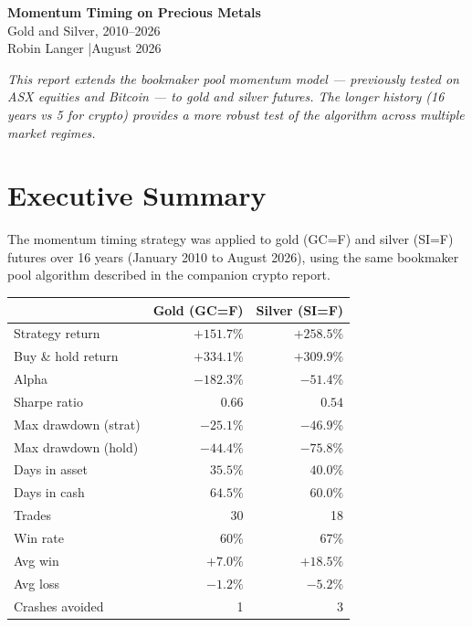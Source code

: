 \documentclass[11pt,a4paper]{article}
\begin{document}
\begin{center}
{\LARGE\bfseries\color{accent} Momentum Timing on Precious Metals}\\[0.5em]
{\large Gold and Silver, 2010--2026}\\[1em]
{\small Robin Langer \quad|\quad August 2026}
\end{center}

\vspace{1em}

\textit{This report extends the bookmaker pool momentum model ---
previously tested on ASX equities and Bitcoin --- to gold and silver
futures. The longer history (16 years vs 5 for crypto) provides a
more robust test of the algorithm across multiple market regimes.}


\section{Executive Summary}

The momentum timing strategy was applied to gold (GC=F) and silver
(SI=F) futures over 16 years (January 2010 to August 2026), using
the same bookmaker pool algorithm described in the companion crypto
report.

\vspace{0.5em}
\begin{tabular}{@{}lrr@{}}
    \toprule
    & \textbf{Gold (GC=F)} & \textbf{Silver (SI=F)} \\
    \midrule
    Strategy return     & $+151.7\%$  & $+258.5\%$ \\
    Buy \& hold return  & $+334.1\%$  & $+309.9\%$ \\
    Alpha               & $-182.3\%$  & $-51.4\%$  \\
    \midrule
    Sharpe ratio        & $0.66$      & $0.54$     \\
    Max drawdown (strat)& $-25.1\%$   & $-46.9\%$  \\
    Max drawdown (hold) & $-44.4\%$   & $-75.8\%$  \\
    \midrule
    Days in asset       & $35.5\%$    & $40.0\%$   \\
    Days in cash        & $64.5\%$    & $60.0\%$   \\
    Trades              & 30          & 18         \\
    Win rate            & 60\%        & 67\%       \\
    Avg win             & $+7.0\%$    & $+18.5\%$  \\
    Avg loss            & $-1.2\%$    & $-5.2\%$   \\
    Crashes avoided     & 1           & 3          \\
    \bottomrule
\end{tabular}
\end{document}
